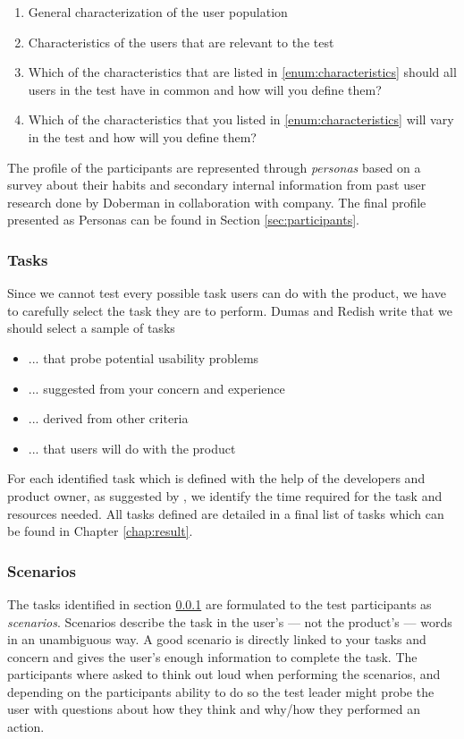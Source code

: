 \begin{enumerate}
  \item General characterization of the user population
  \item \label{enum:characteristics}Characteristics of the users that are relevant to the test
  \item Which of the characteristics that are listed in \ref{enum:characteristics} should all users in the test have in common and how will you define them?
  \item Which of the characteristics that you listed in \ref{enum:characteristics} will vary in the test and how will you define them?
\end{enumerate}

The profile of the participants are represented through \textit{personas} based on a survey about their habits and secondary internal information from past user research done by Doberman in collaboration with company. The final profile presented as Personas can be found in Section \ref{sec:participants}.

\subsubsection{Tasks}
\label{subsubsec:tasks}

Since we cannot test every possible task users can do with the product, we have to carefully select the task they are to perform. Dumas and Redish \cite{Dumas1999} write that we should select a sample of tasks
\begin{itemize}[noitemsep]
  \item ... that probe potential usability problems
  \item ... suggested from your concern and experience
  \item ... derived from other criteria
  \item ... that users will do with the product
\end{itemize}

For each identified task which is defined with the help of the developers and product owner, as suggested by \cite{Dumas1999}, we identify the time required for the task and resources needed. All tasks defined are detailed in a final list of tasks which can be found in Chapter \ref{chap:result}.

\subsubsection{Scenarios}
The tasks identified in section \ref{subsubsec:tasks} are formulated to the test participants as \textit{scenarios}. Scenarios describe the task in the user's --- not the product's --- words in an unambiguous way. A good scenario is directly linked to your tasks and concern and gives the user's enough information to complete the task. The participants where asked to think out loud when performing the scenarios, and depending on the participants ability to do so the test leader might probe the user with questions about how they think and why/how they performed an action.


